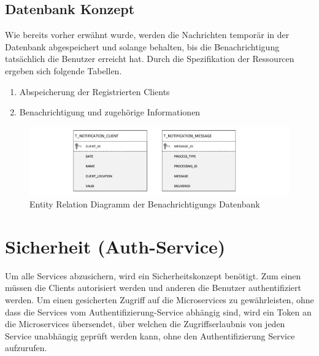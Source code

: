 \subsection*{Datenbank Konzept}
\label{sec:notification_db}
Wie bereits vorher erwähnt wurde, werden die Nachrichten temporär in der Datenbank abgespeichert und solange behalten, bis die Benachrichtigung tatsächlich die Benutzer erreicht hat. Durch die Spezifikation der Ressourcen ergeben sich folgende Tabellen.

\begin{enumerate}
\item Abspeicherung der Registrierten Clients
\item Benachrichtigung und zugehörige Informationen
\end{enumerate}


\begin{figure}[H]
\centering
\includegraphics[width=\pictureWidth cm + 3 cm]{Bilder/ER/Notification_ER.pdf}
\caption{Entity Relation Diagramm der Benachrichtigungs Datenbank\label{fig:notificationER}\protect\footnotemark}
\end{figure}


\section{Sicherheit (Auth-Service)}
\label{sec:auth}
Um alle Services abzusichern, wird ein Sicherheitskonzept benötigt. Zum einen müssen die Clients autorisiert werden und anderen die Benutzer authentifiziert werden. Um einen gesicherten Zugriff auf die Microservices zu gewährleisten, ohne dass die Services vom Authentifizierung-Service abhängig sind, wird ein Token an die Microservices übersendet, über welchen die Zugriffserlaubnis von jeden Service unabhängig geprüft werden kann, ohne den Authentifizierung Service aufzurufen.

